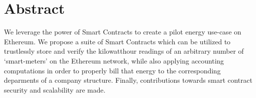 \chapter{Abstract}
We leverage the power of Smart Contracts to create a pilot energy use-case on Ethereum. We propose a suite of Smart Contracts which can be utilized to trustlessly store and verify the kilowatthour readings of an arbitrary number of `smart-meters' on the Ethereum network, while also applying accounting computations in order to properly bill that energy to the corresponding deparments of a company structure. Finally, contributions towards smart contract security and scalability are made.
